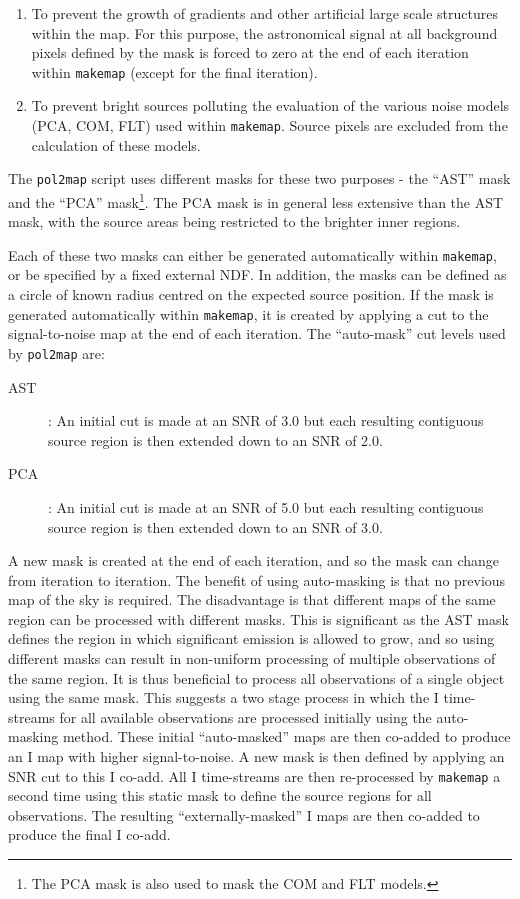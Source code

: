 \documentclass[twoside,11pt]{starlink}
\begin{document}
\begin{enumerate}
\item To prevent the growth of gradients and other artificial large scale
structures within the map. For this purpose, the astronomical signal at
all background pixels defined by the mask is forced to zero at
the end of each iteration within \texttt{makemap} (except for the final
iteration).
\item To prevent bright sources polluting the evaluation of the various
noise models (PCA, COM, FLT) used within \texttt{makemap}. Source pixels
are excluded from the calculation of these models.
\end{enumerate}

The \texttt{pol2map} script uses different masks for these two purposes -
the ``AST'' mask and the ``PCA'' mask\footnote{The PCA mask is also used
to mask the COM and FLT models.}. The PCA mask is in general less
extensive than the AST mask, with the source areas being restricted to
the brighter inner regions.

Each of these two masks can either be generated automatically within
\texttt{makemap}, or be specified by a fixed external NDF. In addition,
the masks can be defined as a circle of known radius centred on the
expected source position. If the mask is generated automatically within
\texttt{makemap}, it is created by applying a cut to the signal-to-noise map
at the end of each iteration. The ``auto-mask'' cut levels used by
\texttt{pol2map} are:

\begin{description}
\item[AST]: An initial cut is made at an SNR of 3.0 but each resulting
contiguous source region is then extended down to an SNR of 2.0.
\item[PCA]: An initial cut is made at an SNR of 5.0 but each resulting
contiguous source region is then extended down to an SNR of 3.0.
\end{description}

A new mask is created at the end of each iteration, and so the mask can
change from iteration to iteration. The benefit of using auto-masking is
that no previous map of the sky is required. The disadvantage is that
different maps of the same region can be processed with different masks.
This is significant as the AST mask defines the region in which
significant emission is allowed to grow, and so using different masks can
result in non-uniform processing of multiple observations of the same
region. It is thus beneficial to process all observations of a single
object using the same mask. This suggests a two stage process in which
the I time-streams for all available observations are processed initially
using the auto-masking method. These initial ``auto-masked'' maps are
then co-added to produce an I map with higher signal-to-noise. A new mask
is then defined by applying an SNR cut to this I co-add. All I
time-streams are then re-processed by \texttt{makemap} a second time
using this static mask to define the source regions for all observations.
The resulting ``externally-masked'' I maps are then co-added to produce
the final I co-add.
\end{document}
